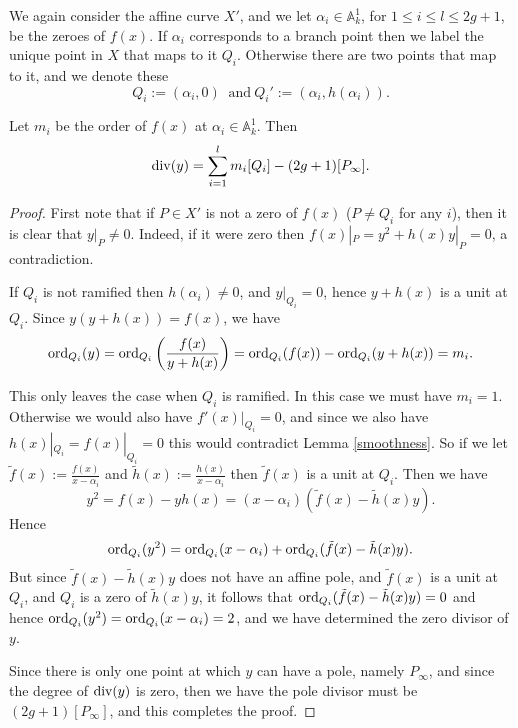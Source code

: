 We again consider the affine curve $X'$, and we let $\alpha_i \in \mathbb A_k^1$, for $1\leq i\leq l \leq 2g+1$, be the zeroes of $f(x)$.
If $\alpha_i$ corresponds to a branch point then we label the unique point in $X$ that maps to it $Q_i$.
Otherwise there are two points that map to it, and we denote these 
    \[  
    Q_i:=(\alpha_i,0)\ \text{ and}\ Q_i':=(\alpha_i,h(\alpha_i)).
    \]


    \begin{lem}\label{ychar2}
    Let $m_i$ be the order of $f(x)$ at $\alpha_i\in \mathbb A_k^1$.
    Then 
        \[
        \operatorname{div}(y) = \sum_{i=1}^l m_i[Q_i] - (2g+1)[P_\infty].
        \]
    \end{lem}
    \begin{proof}
    First note that if $P\in X'$ is not a zero of $f(x)$ (\ie $P\neq Q_i$ for any $i$), then it is clear that $y|_P \neq 0$.
    Indeed, if it were zero then $f(x)|_P = y^2 + h(x)y|_P = 0$, a contradiction.
    
    If $Q_i$ is not ramified then $h(\alpha_i) \neq 0$, and $y|_{Q_i} = 0$, hence $y+h(x)$ is a unit at $Q_i$.
    Since $y(y+h(x)) = f(x)$, we have
        \[
        \operatorname{ord}_{Q_i}(y) = \operatorname{ord}_{Q_i}\left(\frac{f(x)}{y+h(x)}\right) = \operatorname{ord}_{Q_i}(f(x)) -\operatorname{ord}_{Q_i}(y+h(x)) = m_i.
        \]
    
    This only leaves the case when $Q_i$ is ramified. 
    In this case we must have $m_i=1$.
    Otherwise we would also have $f'(x)|_{Q_i} = 0$, and since we also have $h(x)|_{Q_i} = f(x)|_{Q_i} = 0$ this would contradict Lemma \ref{smoothness}.
    So if we let $\tilde f(x) := \frac{f(x)}{x-\alpha_i}$ and $\tilde h(x) := \frac{h(x)}{x-\alpha_i}$ then $\tilde f(x)$ is a unit at $Q_i$.
    Then we have 
        \[
        y^2 = f(x) - yh(x) = (x-\alpha_i)(\tilde f(x) - \tilde h(x)y).
        \]
    Hence
        \[
        \operatorname{ord}_{Q_i}(y^2) = \operatorname{ord}_{Q_i}(x-\alpha_i) + \operatorname{ord}_{Q_i}(\tilde f(x) - \tilde h(x)y).
        \]
    But since $\tilde f(x) - \tilde h(x) y$ does not have an affine pole, and $\tilde f(x)$ is a unit at $Q_i$, and $Q_i$ is a zero of $\tilde h(x) y$, it follows that $\operatorname{ord}_{Q_i}(\tilde f(x) -  \tilde h(x) y) = 0$
    and hence $\operatorname{ord}_{Q_i}(y^2) = \operatorname{ord}_{Q_i}(x-\alpha_i) = 2$, and we have determined the zero divisor of $y$.
    
    Since there is only one point at which $y$ can have a pole, namely $P_\infty$, and since the degree of $\operatorname{div} (y)$ is zero, then we have the pole divisor must be $(2g+1)[P_\infty]$, and this completes the proof.
    \end{proof}



